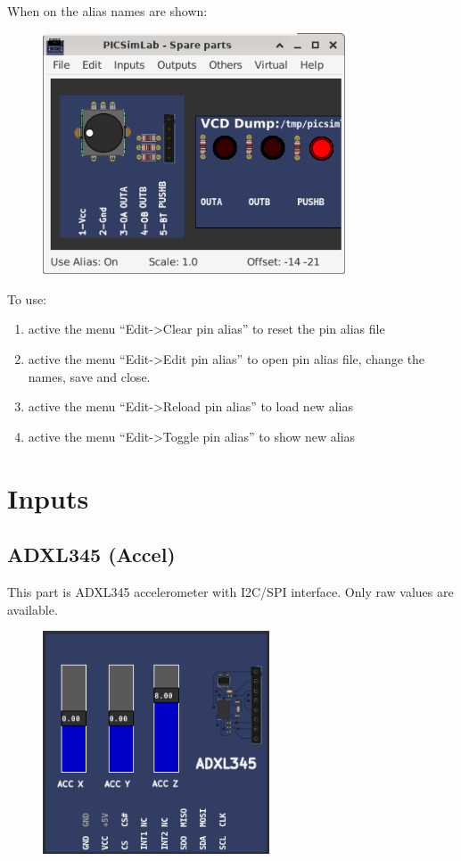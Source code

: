 When on the alias names are shown:
\begin{figure}[H]
\center
\includegraphics[width=0.80\textwidth]{img/pin_alias_on.png} 
\end{figure} 

To use:
\begin{enumerate}
 \item active the menu ``Edit->Clear pin alias'' to reset the pin alias file
 \item active the menu ``Edit->Edit pin alias'' to open pin alias file, change the names, save and close.
 \item active the menu ``Edit->Reload pin alias'' to load new alias
 \item active the menu ``Edit->Toggle pin alias'' to show new alias
\end{enumerate}


\section{Inputs}

\subsection{ADXL345 (Accel)}

This part is ADXL345 accelerometer with I2C/SPI interface. 
Only raw values are available.

\begin{figure}[H]
\center
\includegraphics[width=0.6\textwidth]{img/part_ADXL345.png} 
\end{figure} 


